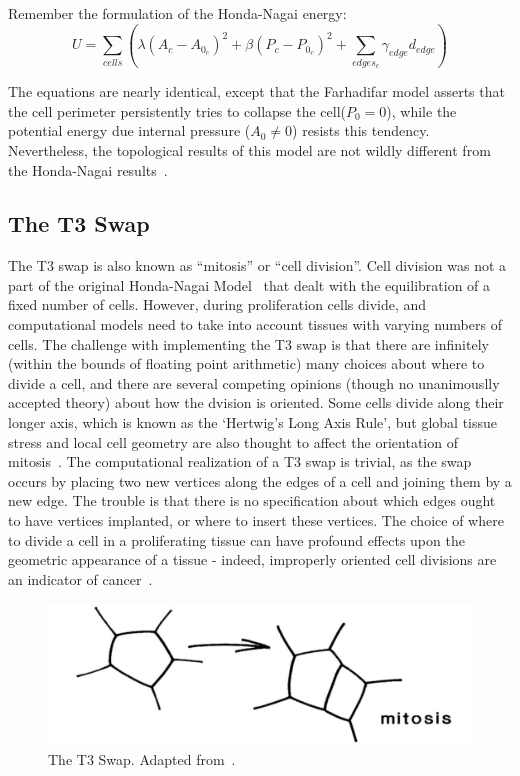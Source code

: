 Remember the formulation of the Honda-Nagai energy:
\begin{equation*}
U = \sum\limits_{cells}\left(\lambda(A_c - A_{0_c})^2 + \beta(P_c - P_{0_c})^2 + \sum_{edges_c}\gamma_{edge}d_{edge}\right)
\end{equation*}

The equations are nearly identical, except that the Farhadifar model asserts that the cell perimeter persistently tries to collapse the cell($P_0=0$), while the potential energy due internal pressure ($A_0\ne0$) resists this tendency. Nevertheless, the topological results of this model are not wildly different from the Honda-Nagai results~\cite{Farhadifar}.

\subsection{The T3 Swap}
The T3 swap is also known as ``mitosis'' or ``cell division''. Cell division was not a part of the original Honda-Nagai Model~\cite{HondaNagai} that dealt with the equilibration of a fixed number of cells. However, during proliferation cells divide, and computational models need to take into account tissues with varying numbers of cells. The challenge with implementing the T3 swap is that there are infinitely (within the bounds of floating point arithmetic) many choices about where to divide a cell, and there are several competing opinions (though no unanimouslly accepted theory) about how the dvision is oriented. Some cells divide along their longer axis, which is known as the `Hertwig's Long Axis Rule', but global tissue stress and local cell geometry are also thought to affect the orientation of mitosis~\cite{Order, Orientation}. The computational realization of a T3 swap is trivial, as the swap occurs by placing two new vertices along the edges of a cell and joining them by a new edge. The trouble is that there is no specification about which edges ought to have vertices implanted, or where to insert these vertices. The choice of where to divide a cell in a proliferating tissue can have profound effects upon the geometric appearance of a tissue - indeed, improperly oriented cell divisions are an indicator of cancer~\cite{EpithelialTopology, misaligned}. 
\begin{figure}
\centering
\includegraphics[width=\textwidth]{../diagrams/t3.png}
\caption[The T3 Swap.]{The T3 Swap. Adapted from~\cite{Soap}.}
\label{fig:t3}
\end{figure}

